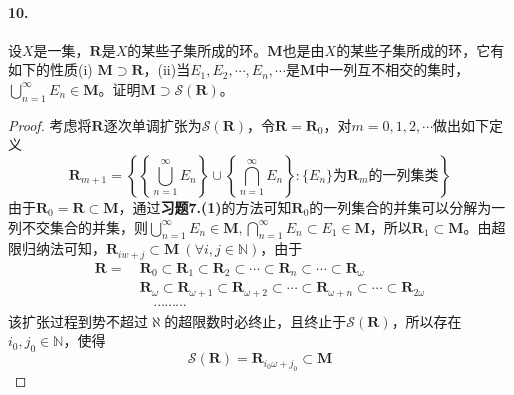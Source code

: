 \documentclass[12pt, a4paper, oneside]{ctexart}
\begin{document}
\paragraph{10.} 设$X$是一集，$\mathbf{R}$是$X$的某些子集所成的环。$\mathbf{M}$也是由$X$的某些子集所成的环，它有如下的性质(i) $\mathbf{M}\supset \mathbf{R}$，(ii)当$E_1,E_2,\cdots,E_n,\cdots$是$\mathbf{M}$中一列互不相交的集时，$\bigcup\limits_{n=1}^\infty E_n\in \mathbf{M}$。证明$\mathbf{M}\supset \mathcal{S}(\mathbf{R})$。
\begin{proof}
    考虑将$\mathbf{R}$逐次单调扩张为$\mathcal{S}(\mathbf{R})$，令$\mathbf{R} = \mathbf{R}_0$，对$m = 0, 1, 2,\cdots$做出如下定义
    \begin{equation*}
        \mathbf{R}_{m+1} = \left\{\left\{\bigcup_{n=1}^\infty E_n\right\}\cup\left\{\bigcap_{n=1}^\infty E_n\right\}:\{E_n\}\text{为}\mathbf{R}_m\text{的一列集类}\right\}
    \end{equation*}
    由于$\mathbf{R}_0=\mathbf{R}\subset \mathbf{M}$，通过\textbf{习题7.(1)}的方法可知$\mathbf{R}_0$的一列集合的并集可以分解为一列不交集合的并集，则$\bigcup\limits_{n=1}^\infty E_n\in \mathbf{M}, \bigcap\limits_{n=1}^\infty E_n\subset E_1\in \mathbf{M}$，所以$\mathbf{R}_1\subset \mathbf{M}$。由超限归纳法可知，$\mathbf{R}_{iw+j}\subset \mathbf{M}\ (\forall i, j\in\mathbb{N})$，由于
    \begin{equation*}
        \begin{aligned}
            \mathbf{R} =&\ \mathbf{R}_0\subset\mathbf{R}_1\subset\mathbf{R}_2\subset\cdots\subset\mathbf{R}_n\subset\cdots\subset\mathbf{R}_\omega\\
            &\ \mathbf{R}_\omega\subset\mathbf{R}_{\omega+1}\subset\mathbf{R}_{\omega+2}\subset\cdots\subset\mathbf{R}_{\omega+n}\subset\cdots\subset\mathbf{R}_{2\omega}\\
            &\ \quad\cdots\cdots\cdots
        \end{aligned}
    \end{equation*}
    该扩张过程到势不超过$\aleph$的超限数时必终止，且终止于$\mathcal{S}(\mathbf{R})$，所以存在$i_0, j_0\in\mathbb{N}$，使得
    \begin{equation*}
        \mathcal{S}(\mathbf{R})=\mathbf{R}_{i_0\omega+j_0} \subset \mathbf{M}
    \end{equation*}
\end{proof}
\end{document}
